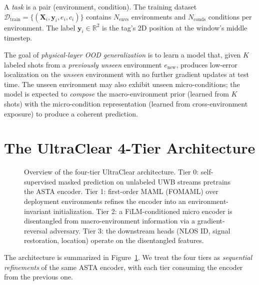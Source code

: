 \documentclass[11pt,letterpaper]{article}
\newcommand{\R}{\mathbb{R}}
\begin{document}
A \emph{task} is a pair (environment, condition). The training
dataset $\mathcal{D}_{\mathrm{train}} = \{ (\bm{X}_i, \bm{y}_i, e_i, c_i) \}$
contains $N_{\mathrm{envs}}$ environments and $N_{\mathrm{conds}}$
conditions per environment. The label $\bm{y}_i \in \R^2$ is the
tag's 2D position at the window's middle timestep.

The goal of \emph{physical-layer OOD generalization} is to learn a
model that, given $K$ labeled shots from a \emph{previously unseen}
environment $e_{\mathrm{new}}$, produces low-error localization on
the \emph{unseen} environment with no further gradient updates at
test time. The unseen environment may also exhibit unseen
micro-conditions; the model is expected to \emph{compose} the
macro-environment prior (learned from $K$ shots) with the
micro-condition representation (learned from cross-environment
exposure) to produce a coherent prediction.

\section{The UltraClear 4-Tier Architecture}
\label{sec:arch}

\begin{figure}[t]
  \centering
  
  \caption{Overview of the four-tier UltraClear architecture.
  Tier 0: self-supervised masked prediction on unlabeled UWB
  streams pretrains the ASTA encoder.
  Tier 1: first-order MAML (FOMAML) over deployment environments
  refines the encoder into an environment-invariant initialization.
  Tier 2: a FiLM-conditioned micro encoder is disentangled from
  macro-environment information via a gradient-reversal adversary.
  Tier 3: the downstream heads (NLOS ID, signal restoration, location)
  operate on the disentangled features.}
  \label{fig:arch}
\end{figure}

The architecture is summarized in Figure~\ref{fig:arch}. We treat
the four tiers as \emph{sequential refinements} of the same ASTA
encoder, with each tier consuming the encoder from the previous one.
\end{document}
